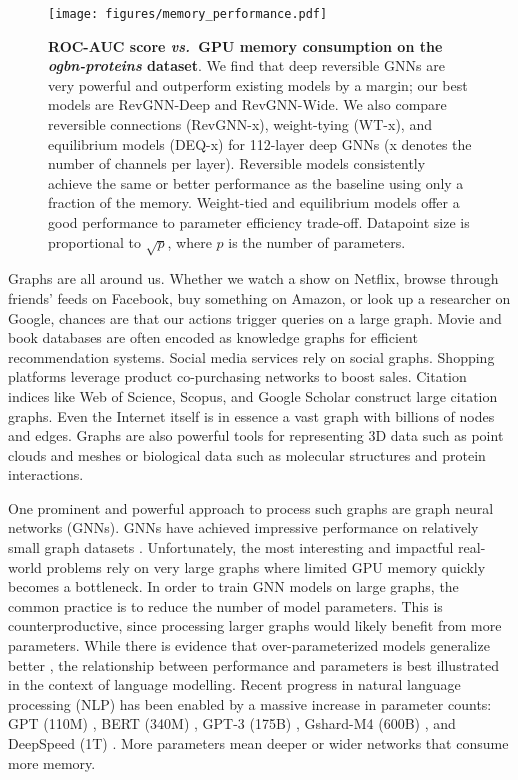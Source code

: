 \documentclass{article}
\newcommand{\vs}{\emph{vs.~}}
\begin{document}
\begin{figure}[h]
    \centering
    \texttt{[image: figures/memory\_performance.pdf]}
    \caption{\textbf{ROC-AUC score \vs GPU memory consumption on the \emph{ogbn-proteins} dataset}. We find that deep reversible GNNs are very powerful and outperform existing models by a margin; our best models are RevGNN-Deep and RevGNN-Wide. We also compare reversible connections (RevGNN-x), weight-tying (WT-x), and equilibrium models (DEQ-x) for 112-layer deep GNNs (x denotes the number of channels per layer). Reversible models consistently achieve the same or better performance as the baseline using only a fraction of the memory. Weight-tied and equilibrium models offer a good performance to parameter efficiency trade-off. Datapoint size is proportional to $\sqrt{p}$, where $p$ is the number of parameters. 
    }
    \label{fig:memory_performance_obgn_proteins}
    \vspace{-16pt}
\end{figure}

Graphs are all around us. 
Whether we watch a show on Netflix, browse through friends' feeds on Facebook, buy something on Amazon, or look up a researcher on Google, chances are that our actions trigger queries on a large graph. Movie and book databases are often encoded as knowledge graphs for efficient recommendation systems. Social media services rely on social graphs. Shopping platforms leverage product co-purchasing networks to boost sales. Citation indices like Web of Science, Scopus, and Google Scholar construct large citation graphs. Even the Internet itself is in essence a vast graph with billions of nodes and edges. 
Graphs are also powerful tools for representing 3D data such as point clouds and meshes or biological data such as molecular structures and protein interactions.

One prominent and powerful approach to process such graphs are graph neural networks (GNNs). GNNs have achieved impressive performance on relatively small graph datasets \citep{yang2016revisiting,zitnik2017predicting,shchur2018pitfalls}.
Unfortunately, the most interesting and impactful real-world problems rely on very large graphs where limited GPU memory quickly becomes a bottleneck. In order to train GNN models on large graphs, the common practice is to reduce the number of model parameters. This is counterproductive, since processing larger graphs would likely benefit from more parameters.  
While there is evidence that over-parameterized models generalize better \citep{neyshabur2018towards,Belkin2019}, the relationship between performance and parameters is best illustrated in the context of language modelling. Recent progress in natural language processing (NLP) has been enabled by a massive increase in parameter counts: GPT (110M) \citep{radford2018improving}, BERT (340M) \citep{devlin2018bert}, GPT-3 (175B) \citep{brown2020language}, Gshard-M4 (600B) \citep{lepikhin2020gshard}, and DeepSpeed (1T) \citep{rasley2020deepspeed}. More parameters mean deeper or wider networks that consume more memory.
\end{document}
